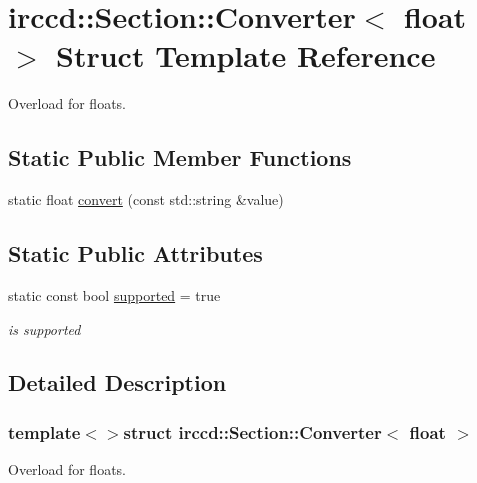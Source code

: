 \hypertarget{a00020}{\section{irccd\-:\-:Section\-:\-:Converter$<$ float $>$ Struct Template Reference}
\label{a00020}
}


Overload for floats.  


\subsection*{Static Public Member Functions}
\begin{DoxyCompactItemize}
\item 
static float \hyperlink{a00020_ad3785eef13d0e181646d4a4c3afc936a}{convert} (const std\-::string \&value)
\end{DoxyCompactItemize}
\subsection*{Static Public Attributes}
\begin{DoxyCompactItemize}
\item 
\hypertarget{a00020_a1a1f913ed4dfbe0de756e8cb716798ea}{static const bool \hyperlink{a00020_a1a1f913ed4dfbe0de756e8cb716798ea}{supported} = true}\label{a00020_a1a1f913ed4dfbe0de756e8cb716798ea}

\begin{DoxyCompactList}\small\item\em is supported \end{DoxyCompactList}\end{DoxyCompactItemize}


\subsection{Detailed Description}
\subsubsection*{template$<$$>$struct irccd\-::\-Section\-::\-Converter$<$ float $>$}

Overload for floats. 

